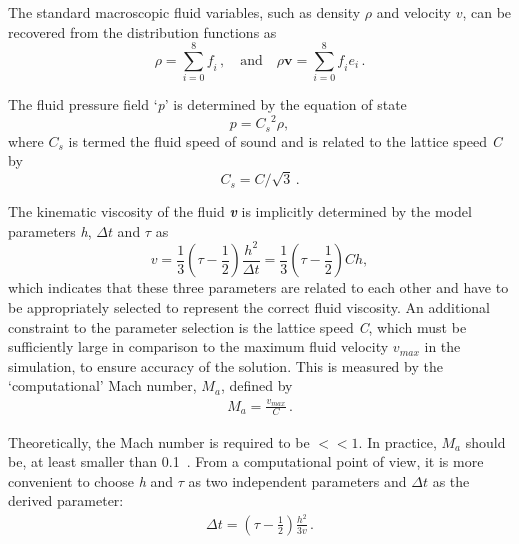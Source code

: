 The standard macroscopic fluid variables, such as density 
$\rho$ and velocity 
$\mathbf{\mathit{ v}}$, can be recovered from the distribution functions as
%
\begin{equation}
	\rho = \sum\limits_{\mathit{i}=0}^{8}{\mathit{f_i}}\,, \quad \mbox{and} 
	\quad \rho \mathbf{v} 
	= \sum\limits_{\mathit{i}=0}^{8}{\mathit{f_i}}\mathbf{\mathit{e_i}}\,.
\end{equation}

The fluid pressure field `\textit{p}' is determined by the 
equation of state
%
\begin{equation}
	\mathit{p}=\mathit{C_s}^{2} \rho,
\end{equation}
%
\noindent where $\mathit{C_s}$ is termed the fluid speed of 
sound and is related to the lattice speed \textit{C} by
%
\begin{equation}
	\mathit{C_s}=\mathit{C}/\sqrt{3}\,.
\end{equation}

The kinematic viscosity of the fluid \textbf{\textit{v}} is 
implicitly determined by the model parameters \textit{h}, 
$\Delta \mathit{t}$ and $\tau$ 
as
%
\begin{equation}
	\mathit{v}=\frac{1}{3}(\tau - \frac{1}{2})\frac{\mathit{h}^{2}}{\Delta 
	\mathit{t}} = \frac{1}{3}(\tau - \frac{1}{2})\mathit{Ch},
\end{equation}
%
\noindent which indicates that these three parameters are 
related to each other and have to be appropriately selected to 
represent the correct fluid viscosity. An additional constraint 
to the parameter selection is the lattice speed \textit{C}, 
which must be sufficiently large in comparison to the maximum 
fluid velocity $\mathit{v}_{\mathit{max}}$ in the simulation, 
to ensure accuracy of the solution. This is measured by the 
`computational' Mach number, $\mathit{M}_{\mathit{a}}$, defined 
by
%
\begin{align}
	\mathit{M}_{\mathit{a}}=\frac{\mathit{v}_{\mathit{max}}}{\mathit{C}}\,.
\end{align}

Theoretically, the Mach number is required to be $<< 1$. In 
practice, $\mathit{M}_{\mathit{a}}$ should be, at least smaller 
than 0.1~\citep{He1997}. From a computational point of view, it 
is more convenient to choose \textit{h} and $\tau$ as two 
independent parameters and $\Delta \mathit{t}$ as the derived 
parameter:
%
\begin{align}
	\Delta \mathit{t} = (\tau - \frac{1}{2}) \frac{h^{2}}{3\mathit{v}}\,.
\end{align}

